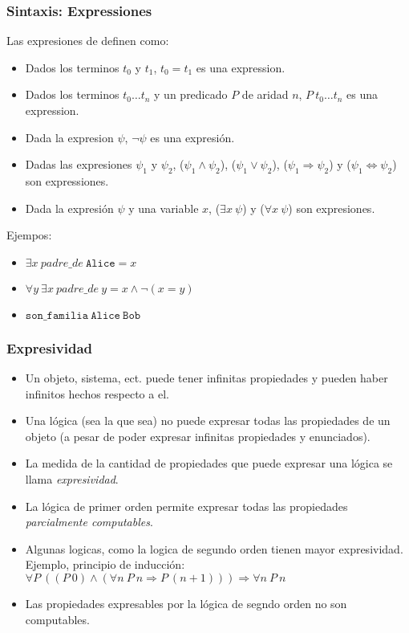 \documentclass{beamer}
\begin{document}
\begin{frame}
    \frametitle{Sintaxis: Expressiones}
    Las expresiones de definen como:
    \begin{itemize}
        \item{Dados los terminos $t_0$ y $t_1$, $t_0=t_1$ es una expression.}
        \item{Dados los terminos $t_0\ldots t_n$ y un predicado $P$ de aridad $n$, $P\ t_0\ldots t_n$ es una expression.}
        \item{Dada la expresion $\psi$, $\neg\psi$ es una expresi\'on.}
        \item{Dadas las expresiones $\psi_1$ y $\psi_2$, ($\psi_1\wedge\psi_2$), ($\psi_1\vee\psi_2$), ($\psi_1\Rightarrow\psi_2$) y ($\psi_1\Leftrightarrow\psi_2$) son expressiones.}
        \item{Dada la expresi\'on $\psi$ y una variable $x$, ($\exists x\ \psi$) y ($\forall x\ \psi$) son expresiones.}
    \end{itemize}
    Ejempos:
    \begin{itemize}
        \item $\exists x\ padre\_de\ \mathtt{Alice}=x$
        \item $\forall y\ \exists x\ padre\_de\ y=x\wedge \neg(x=y)$
        \item $\mathtt{son\_familia}\ \mathtt{Alice}\ \mathtt{Bob}$
    \end{itemize}
\end{frame}

\begin{frame}
    \frametitle{Expresividad}
    \begin{itemize}
        \item{Un objeto, sistema, ect. puede tener infinitas propiedades y pueden
        haber infinitos hechos respecto a el.}
        \item{Una l\'ogica (sea la que sea) no puede expresar todas las propiedades
        de un objeto (a pesar de poder expresar infinitas propiedades y enunciados).}
        \item{La medida de la cantidad de propiedades que puede expresar una l\'ogica
        se llama \emph{expresividad}.}
        \item{La l\'ogica de primer orden permite expresar todas las propiedades
        \emph{parcialmente computables}.}
        \item{Algunas logicas, como la logica de segundo orden tienen mayor expresividad.
        Ejemplo, principio de inducci\'on: $\forall P\ ((P\ 0)\wedge(\forall n\ P\ n\Rightarrow P\ (n+1)))\Rightarrow \forall n\ P\ n$}
        \item{Las propiedades expresables por la l\'ogica de segndo orden no son computables.}
    \end{itemize}
\end{frame}
\end{document}
